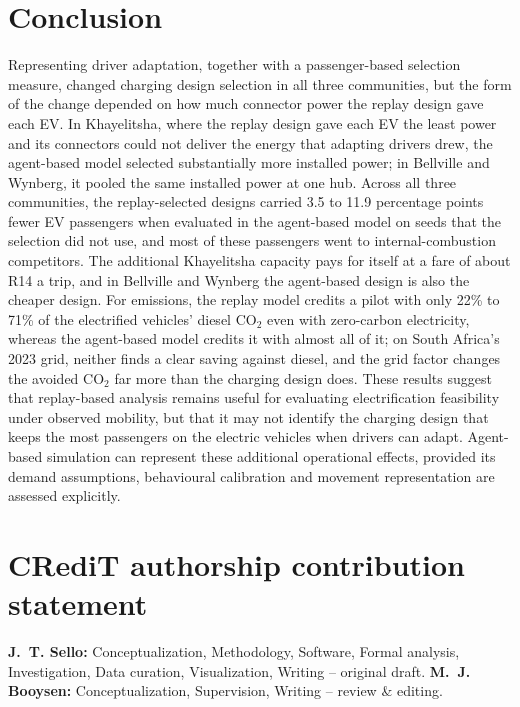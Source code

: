 \documentclass{elsarticle}
\begin{document}
\section{Conclusion}
Representing driver adaptation, together with a passenger-based selection measure, changed charging design selection in all three communities, but the form of the change depended on how much connector power the replay design gave each EV. In Khayelitsha, where the replay design gave each EV the least power and its connectors could not deliver the energy that adapting drivers drew, the agent-based model selected substantially more installed power; in Bellville and Wynberg, it pooled the same installed power at one hub. Across all three communities, the replay-selected designs carried 3.5 to 11.9 percentage points fewer EV passengers when evaluated in the agent-based model on seeds that the selection did not use, and most of these passengers went to internal-combustion competitors. The additional Khayelitsha capacity pays for itself at a fare of about R14 a trip, and in Bellville and Wynberg the agent-based design is also the cheaper design. For emissions, the replay model credits a pilot with only 22\% to 71\% of the electrified vehicles' diesel CO$_2$ even with zero-carbon electricity, whereas the agent-based model credits it with almost all of it; on South Africa's 2023 grid, neither finds a clear saving against diesel, and the grid factor changes the avoided CO$_2$ far more than the charging design does. These results suggest that replay-based analysis remains useful for evaluating electrification feasibility under observed mobility, but that it may not identify the charging design that keeps the most passengers on the electric vehicles when drivers can adapt. Agent-based simulation can represent these additional operational effects, provided its demand assumptions, behavioural calibration and movement representation are assessed explicitly.

\section*{CRediT authorship contribution statement}
\textbf{J.~T. Sello:} Conceptualization, Methodology, Software, Formal analysis, Investigation, Data curation, Visualization, Writing -- original draft. \textbf{M.~J. Booysen:} Conceptualization, Supervision, Writing -- review \& editing.
\end{document}
